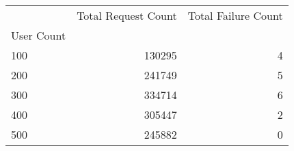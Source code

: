 \begin{tabular}{lrr}
\toprule
 & Total Request Count & Total Failure Count \\
User Count &  &  \\
\midrule
100 & 130295 & 4 \\
200 & 241749 & 5 \\
300 & 334714 & 6 \\
400 & 305447 & 2 \\
500 & 245882 & 0 \\
\bottomrule
\end{tabular}
